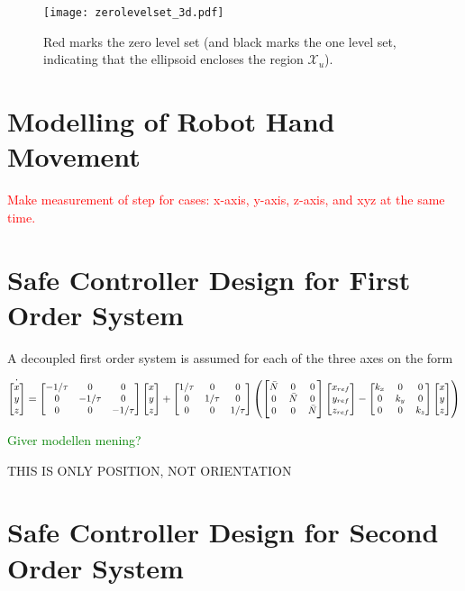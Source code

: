 \begin{figure}[htbp]
\centering
\hspace*{-15mm}
\texttt{[image: zerolevelset\_3d.pdf]}
\caption{Red marks the zero level set (and black marks the one level set, indicating that the ellipsoid encloses the region $\mathcal{X}_u$).}
\label{fig:zerolevelset_3d}
\end{figure}


\section{Modelling of Robot Hand Movement}
\textcolor{red}{Make measurement of step for cases: x-axis, y-axis, z-axis, and xyz at the same time.}

\section{Safe Controller Design for First Order System}

A decoupled first order system is assumed for each of the three axes on the form

\begin{equation}
\small
\dot{\begin{bmatrix}
	x\\y\\z
	\end{bmatrix}} =
\begin{bmatrix}
-1/\tau & 0 & 0\\0 & -1/\tau & 0 \\ 0 & 0 & -1/\tau
\end{bmatrix}
\begin{bmatrix}
x\\y\\z
\end{bmatrix} +
\begin{bmatrix}
1/\tau& 0 & 0 \\ 0& 1/\tau & 0 \\0& 0& 1/\tau
\end{bmatrix} 
\left(
\begin{bmatrix}
\bar{N} & 0 & 0 \\0 & \bar{N} & 0 \\0& 0& \bar{N}
\end{bmatrix}
\begin{bmatrix}
x_{ref}\\y_{ref}\\z_{ref}
\end{bmatrix}
-
\begin{bmatrix}
k_x & 0 & 0 \\0 & k_y & 0 \\0& 0&  k_z
\end{bmatrix}
\begin{bmatrix}
x\\y\\z
\end{bmatrix}
\right)
\end{equation}

\textcolor{green}{Giver modellen mening?}

THIS IS ONLY POSITION, NOT ORIENTATION

\section{Safe Controller Design for Second Order System}